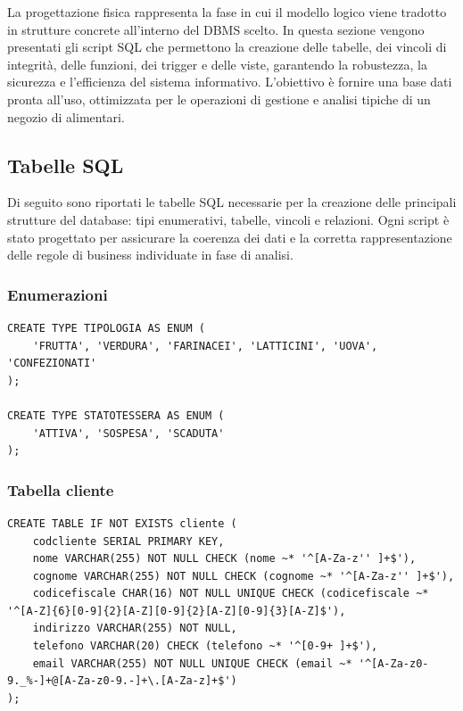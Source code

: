 \documentclass[a4paper,12pt]{article}
\begin{document}
\noindent
La progettazione fisica rappresenta la fase in cui il modello logico viene tradotto in strutture concrete all’interno del DBMS scelto. In questa sezione vengono presentati gli script SQL che permettono la creazione delle tabelle, dei vincoli di integrità, delle funzioni, dei trigger e delle viste, garantendo la robustezza, la sicurezza e l’efficienza del sistema informativo. L’obiettivo è fornire una base dati pronta all’uso, ottimizzata per le operazioni di gestione e analisi tipiche di un negozio di alimentari.

\subsection{Tabelle SQL}
\noindent
Di seguito sono riportati le tabelle SQL necessarie per la creazione delle principali strutture del database: tipi enumerativi, tabelle, vincoli e relazioni. Ogni script è stato progettato per assicurare la coerenza dei dati e la corretta rappresentazione delle regole di business individuate in fase di analisi.

\subsubsection*{Enumerazioni}
\begin{lstlisting}[style=sqlstyle]
CREATE TYPE TIPOLOGIA AS ENUM (
    'FRUTTA', 'VERDURA', 'FARINACEI', 'LATTICINI', 'UOVA', 'CONFEZIONATI'
);

CREATE TYPE STATOTESSERA AS ENUM (
    'ATTIVA', 'SOSPESA', 'SCADUTA'
);
\end{lstlisting}

\subsubsection*{Tabella cliente}
\vspace{1.5em}
\begin{lstlisting}[style=sqlstyle]
CREATE TABLE IF NOT EXISTS cliente (
    codcliente SERIAL PRIMARY KEY,
    nome VARCHAR(255) NOT NULL CHECK (nome ~* '^[A-Za-z'' ]+$'),
    cognome VARCHAR(255) NOT NULL CHECK (cognome ~* '^[A-Za-z'' ]+$'),
    codicefiscale CHAR(16) NOT NULL UNIQUE CHECK (codicefiscale ~* '^[A-Z]{6}[0-9]{2}[A-Z][0-9]{2}[A-Z][0-9]{3}[A-Z]$'),
    indirizzo VARCHAR(255) NOT NULL,
    telefono VARCHAR(20) CHECK (telefono ~* '^[0-9+ ]+$'),
    email VARCHAR(255) NOT NULL UNIQUE CHECK (email ~* '^[A-Za-z0-9._%-]+@[A-Za-z0-9.-]+\.[A-Za-z]+$')
);
\end{lstlisting}
\vspace{1.5em}
\end{document}
